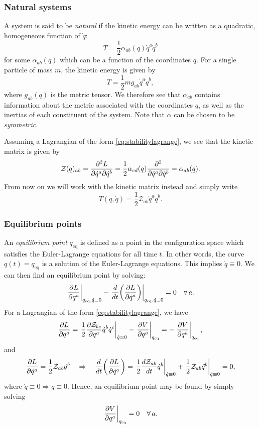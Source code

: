 \documentclass{article}
\begin{document}
\subsubsection*{Natural systems}
A system is said to be \textit{natural} if the kinetic energy can be written as a quadratic, homogeneous function of $ \dot{q} $:
\begin{equation}
	T = \frac{1}{2} \alpha_{ab}(q) \dot{q}^{a} \dot{q}^{b}
\end{equation}
for some $ \alpha_{ab}(q) $ which can be a function of the coordinates $ q $. For a single particle of mass $ m $, the kinetic energy is given by
\begin{equation}
	T = \frac{1}{2} m g_{ab} \dot{q}^{a} \dot{q}^{b},
\end{equation}
where $ g_{ab}(q) $ is the metric tensor. We therefore see that $ \alpha_{ab} $ contains information about the metric associated with the coordinates $ q $, as well as the inertias of each constituent of the system. Note that $ \alpha $ can be chosen to be \textit{symmetric}.
\par
Assuming a Lagrangian of the form \eqref{eq:stabilitylagrange}, we see that the kinetic matrix is given by
\begin{equation}
	\mathcal{Z}(q)_{ab} = \pdv{L}{\dot{q}^{a}}{\dot{q}^{b}} = \frac{1}{2} \alpha_{cd}(q) \pdv{}{\dot{q}^{a}}{\dot{q}^{b}} (\dot{q}^{c}\dot{q}^{d}) = \alpha_{ab}(q).
\end{equation}
From now on we will work with the kinetic matrix instead and simply write
\begin{equation}
	T(q, \dot{q}) = \frac{1}{2} \mathcal{Z}_{ab} \dot{q}^{a} \dot{q}^{b}.
\end{equation}
\subsubsection*{Equilibrium points}
An \textit{equilibrium point} $ q_{\text{eq}} $ is defined as a point in the configuration space which satisfies the Euler-Lagrange equations for all time $ t $. In other words, the curve $ q(t) = q_{\text{eq}} $ is a solution of the Euler-Lagrange equations. This implies $ \dot{q} \equiv 0 $. We can then find an equilibrium point by solving:
\begin{equation}
	\eval{\pdv{L}{q^{a}}}_{q_{\text{eq}}, \dot{q} \equiv 0} - \eval{\dv{t} \qty(\pdv{L}{\dot{q}^{a}})}_{q_{\text{eq}}, \dot{q} \equiv 0} = 0 \quad \forall \, a.
\end{equation}
For a Lagrangian of the form \eqref{eq:stabilitylagrange}, we have
\[
	\pdv{L}{q^{a}} = \eval{\frac{1}{2} \pdv{\mathcal{Z}_{bc}}{q^{a}} \dot{q}^{b} \dot{q}^{c}}_{\dot{q} \equiv 0} - \eval{\pdv{V}{q^{a}}}_{q_{\text{eq}}} = - \eval{\pdv{V}{q^{a}}}_{q_{\text{eq}}} ,
\]
and
\[
	\pdv{L}{\dot{q}^{a}} = \frac{1}{2} \mathcal{Z}_{ab} \dot{q}^{b} \implies \dv{t}(\pdv{L}{\dot{q}^{a}}) = \eval{\frac{1}{2} \dv{\mathcal{Z}_{ab}}{t} \dot{q}^{b}}_{\dot{q} \equiv 0} + \eval{\frac{1}{2} \mathcal{Z}_{ab} \ddot{q}^{b}}_{\dot{q} \equiv 0} = 0,
\]
where $ \dot{q} \equiv 0 \Rightarrow \ddot{q} \equiv 0 $. Hence, an equilibrium point may be found by simply solving
\begin{equation}
	\eval{\pdv{V}{q^{a}}}_{q_{\text{eq}}} = 0 \quad \forall \, a.
\end{equation}
\end{document}
